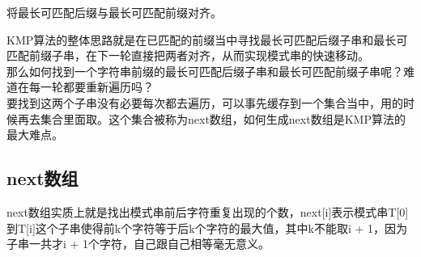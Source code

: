 将最长可匹配后缀与最长可匹配前缀对齐。

\begin{table}[H]
	\centering
\end{table}

KMP算法的整体思路就是在已匹配的前缀当中寻找最长可匹配后缀子串和最长可匹配前缀子串，在下一轮直接把两者对齐，从而实现模式串的快速移动。\\

那么如何找到一个字符串前缀的最长可匹配后缀子串和最长可匹配前缀子串呢？难道在每一轮都要重新遍历吗？\\

要找到这两个子串没有必要每次都去遍历，可以事先缓存到一个集合当中，用的时候再去集合里面取。这个集合被称为next数组，如何生成next数组是KMP算法的最大难点。\\

\subsection{next数组}

next数组实质上就是找出模式串前后字符重复出现的个数，next[i]表示模式串T[0]到T[i]这个子串使得前k个字符等于后k个字符的最大值，其中k不能取i + 1，因为子串一共才i + 1个字符，自己跟自己相等毫无意义。\\


